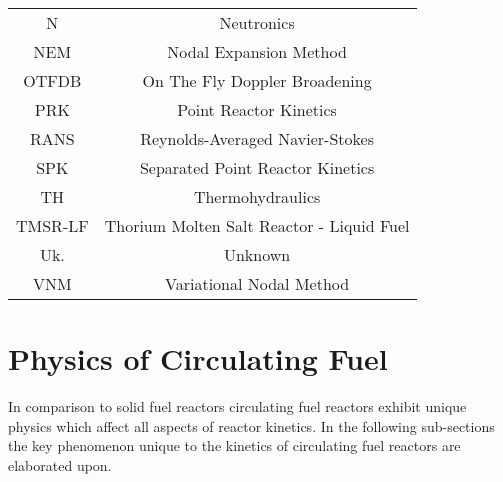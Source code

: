 \documentclass[review]{elsarticle}
\begin{document}
\begin{table}[h]
\begin{center}
\begin{tabular}{|c c|}
            N & Neutronics \\
            NEM & Nodal Expansion Method \\
            OTFDB & On The Fly Doppler Broadening \\
            PRK & Point Reactor Kinetics \\
            RANS & Reynolds-Averaged Navier-Stokes \\
            SPK & Separated Point Reactor Kinetics \\
            TH & Thermohydraulics \\
            TMSR-LF & Thorium Molten Salt Reactor - Liquid Fuel \\
            Uk. & Unknown \\
            VNM & Variational Nodal Method \\
            \hline
        \end{tabular}
    \end{center}
\end{table}

\section{Physics of Circulating Fuel} \label{sec:physics}
In comparison to solid fuel reactors circulating fuel reactors exhibit unique
physics which affect all aspects of reactor kinetics. In the following
sub-sections the key phenomenon unique to the kinetics of circulating fuel
reactors are elaborated upon.
\end{document}
